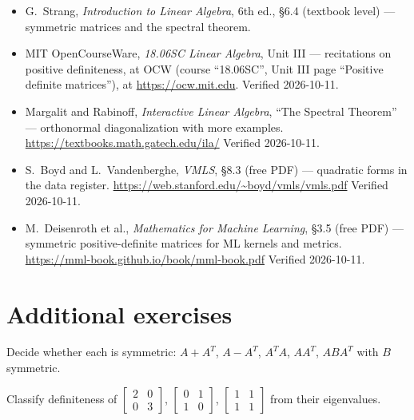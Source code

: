 \begin{itemize}
\item G.~Strang, \emph{Introduction to Linear Algebra}, 6th ed., \S6.4
(textbook level) --- symmetric matrices and the spectral theorem.
\item MIT OpenCourseWare, \emph{18.06SC Linear Algebra}, Unit III ---
recitations on positive definiteness, at OCW (course ``18.06SC'',
Unit III page ``Positive definite matrices''), at
\url{https://ocw.mit.edu}. Verified 2026-10-11.
\item Margalit and Rabinoff, \emph{Interactive Linear Algebra},
``The Spectral Theorem'' --- orthonormal diagonalization with more
examples. \newline
\url{https://textbooks.math.gatech.edu/ila/}
Verified 2026-10-11.
\item S.~Boyd and L.~Vandenberghe, \emph{VMLS}, \S8.3 (free PDF) ---
quadratic forms in the data register.\newline
\url{https://web.stanford.edu/~boyd/vmls/vmls.pdf}
Verified 2026-10-11.
\item M.~Deisenroth et al., \emph{Mathematics for Machine Learning},
\S3.5 (free PDF) --- symmetric positive-definite matrices for ML
kernels and metrics.\newline
\url{https://mml-book.github.io/book/mml-book.pdf}
Verified 2026-10-11.
\end{itemize}

\section*{Additional exercises}

\begin{exercise}[easy]
Decide whether each is symmetric: $A+A^{T}$, $A-A^{T}$, $A^{T}A$,
$AA^{T}$, $ABA^{T}$ with $B$ symmetric.
\end{exercise}

\begin{exercise}[easy]
Classify definiteness of $\begin{bmatrix}2&0\\0&3\end{bmatrix}$,
$\begin{bmatrix}0&1\\1&0\end{bmatrix}$,
$\begin{bmatrix}1&1\\1&1\end{bmatrix}$ from their eigenvalues.
\end{exercise}

